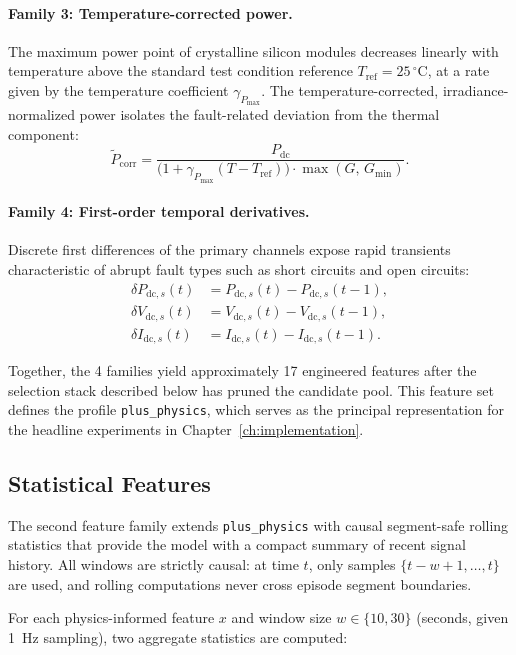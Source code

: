 \paragraph{Family 3: Temperature-corrected power.}
The maximum power point of crystalline silicon modules decreases linearly with temperature above the standard test condition reference $T_{\mathrm{ref}} = 25\,^\circ\mathrm{C}$, at a rate given by the temperature coefficient $\gamma_{P_{\max}}$. The temperature-corrected, irradiance-normalized power isolates the fault-related deviation from the thermal component:
\[
    \tilde{P}_{\mathrm{corr}} = \frac{P_{\mathrm{dc}}}{\bigl(1 + \gamma_{P_{\max}}(T - T_{\mathrm{ref}})\bigr)\cdot\max(G,\, G_{\min})}.
\]

\paragraph{Family 4: First-order temporal derivatives.}
Discrete first differences of the primary channels expose rapid transients characteristic of abrupt fault types such as short circuits and open circuits:
\begin{align}
    \delta P_{\mathrm{dc},s}(t) &= P_{\mathrm{dc},s}(t) - P_{\mathrm{dc},s}(t-1), \nonumber\\
    \delta V_{\mathrm{dc},s}(t) &= V_{\mathrm{dc},s}(t) - V_{\mathrm{dc},s}(t-1), \nonumber\\
    \delta I_{\mathrm{dc},s}(t) &= I_{\mathrm{dc},s}(t) - I_{\mathrm{dc},s}(t-1). \nonumber
\end{align}

Together, the 4 families yield approximately 17 engineered features after the selection stack described below has pruned the candidate pool. This feature set defines the profile \texttt{plus\_physics}, which serves as the principal representation for the headline experiments in Chapter~\ref{ch:implementation}.

\subsection{Statistical Features}

The second feature family extends \texttt{plus\_physics} with causal segment-safe rolling statistics that provide the model with a compact summary of recent signal history. All windows are strictly causal: at time $t$, only samples $\{t-w+1, \ldots, t\}$ are used, and rolling computations never cross episode segment boundaries.

For each physics-informed feature $x$ and window size $w \in \{10, 30\}$ (seconds, given 1~Hz sampling), two aggregate statistics are computed:

